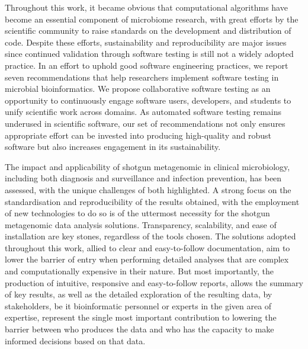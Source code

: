 Throughout this work, it became obvious that computational algorithms have become an essential component of microbiome research, with great efforts by the scientific community to raise standards on the development and distribution of code. Despite these efforts, sustainability and reproducibility are major issues since continued validation through software testing is still not a widely adopted practice. In an effort to uphold good software engineering practices, we report seven recommendations that help researchers implement software testing in microbial bioinformatics. We propose collaborative software testing as an opportunity to continuously engage software users, developers, and students to unify scientific work across domains. As automated software testing remains underused in scientific software, our set of recommendations not only ensures appropriate effort can be invested into producing high-quality and robust software but also increases engagement in its sustainability. 

The impact and applicability of shotgun metagenomic in clinical microbiology, including both diagnosis and surveillance and infection prevention, has been assessed, with the unique challenges of both highlighted. A strong focus on the standardisation and reproducibility of the results obtained, with the employment of new technologies to do so is of the uttermost necessity for the shotgun metagenomic data analysis solutions. Transparency, scalability, and ease of installation are key stones, regardless of the tools chosen. The solutions adopted throughout this work, allied to clear and easy-to-follow documentation, aim to lower the barrier of entry when performing detailed analyses that are complex and computationally expensive in their nature. But most importantly, the production of intuitive, responsive and easy-to-follow reports, allows the summary of key results, as well as the detailed exploration of the resulting data, by stakeholders, be it bioinformatic personnel or experts in the given area of expertise, represent the single most important contribution to lowering the barrier between who produces the data and who has the capacity to make informed decisions based on that data. 